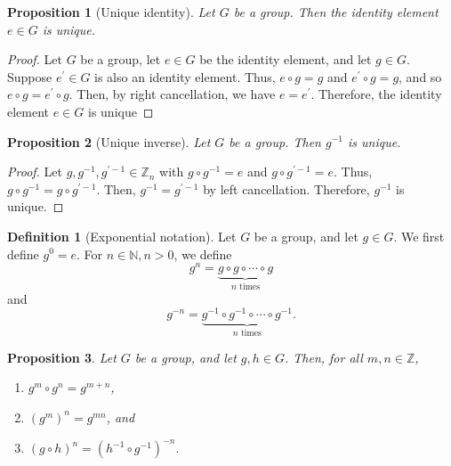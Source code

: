 \documentclass[12pt, titlepage]{amsart}
\newcommand\Z{{\mathbb Z}}
\newcommand\N{{\mathbb N}}
\newtheorem{prop}{Proposition}[subsection]
\theoremstyle{definition}
\newtheorem{definition}{Definition}[subsection]
\begin{document}
	\begin{prop}[Unique identity]\label{proposition:unique_indenty}
		Let $G$ be a group. Then the identity element $e \in G$ is unique.
	\end{prop}
	
	\begin{proof}
		Let $G$ be a group, let $e\in G$ be the identity element, and let $g \in G$.
		Suppose $e^\prime \in G$ is also an identity element.
		Thus, $e \circ g = g$ and $e^\prime \circ g = g$, and so $e \circ g = e^\prime \circ g$. 
		Then, by right cancellation, we have $e = e^\prime$. 
		Therefore, the identity element $e \in G$ is unique
	\end{proof}
	
	\begin{prop}[Unique inverse]\label{proposition:unique_inverse}
		Let $G$ be a group. Then $g^{-1}$ is unique.
	\end{prop}
	
	\begin{proof}
		Let $g, g^{-1}, g^{\prime -1} \in \Z_n$ with $g \circ g^{-1} = e$ and $g \circ g^{\prime -1} = e$. 
		Thus, $g \circ g^{-1} = g \circ g^{\prime -1}$.
		Then, $g^{-1} = g^{\prime -1}$ by left cancellation.
		Therefore, $g^{-1}$ is unique.
	\end{proof}
	
	
	\begin{definition}[Exponential notation]\label{definition:exponential_notation}
		Let $G$ be a group, and let $g \in G$. We first define $g^0 = e$. For $n \in \N, n>0$, we define 
		$$ g^n = \underbrace{g \circ g \circ \cdots \circ g}_{n \text{ times}}$$ and 
		$$ g^{-n} = \underbrace{g^{-1} \circ g^{-1} \circ \cdots \circ g^{-1}}_{n \text{ times}}.$$
	\end{definition}
	
	\begin{prop}
		Let $G$ be a group, and let $g,h \in G$. Then, for all $m,n \in \Z$,
		\begin{enumerate}
			\item $g^m \circ g^n = g^{m+n}$,
			\item $(g^m)^n = g^{mn}$, and 
			\item $(g \circ h)^n = (h^{-1} \circ g^{-1})^{-n}.$
		\end{enumerate}
	\end{prop}
	
\end{document}
